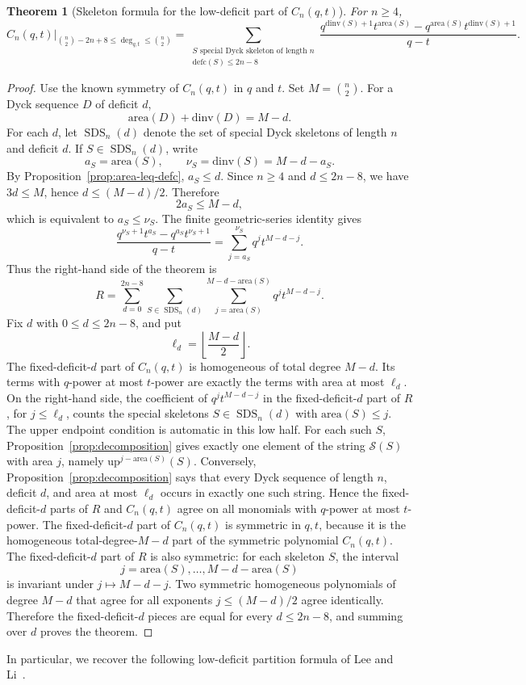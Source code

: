 \documentclass[11pt]{article}
\theoremstyle{plain}
\newtheorem{theorem}{Theorem}[section]
\theoremstyle{definition}
\theoremstyle{remark}
\newcommand{\dinv}{\mathrm{dinv}}
\newcommand{\area}{\mathrm{area}}
\newcommand{\defc}{\mathrm{defc}}
\begin{document}
\begin{theorem}[Skeleton formula for the low-deficit part of \(C_n(q,t)\)]
\label{thm:qt-catalan-skeleton}
For \(n\ge 4\),
\[
  \left.C_n(q,t)\right|_{\binom n2-2n+8\le \deg_{q,t}\le \binom n2}
  =
  \sum_{\substack{S\text{ special Dyck skeleton of length }n\\
                  \defc(S)\le 2n-8}}
  \frac{q^{\dinv(S)+1}t^{\area(S)}
        -q^{\area(S)}t^{\dinv(S)+1}}{q-t}.
\]
\end{theorem}
\begin{proof}
Use the known symmetry of \(C_n(q,t)\) in \(q\) and \(t\).  Set
\(M=\binom n2\).  For a Dyck sequence \(D\) of deficit \(d\),
\[
  \area(D)+\dinv(D)=M-d.
\]
For each \(d\), let \(\operatorname{SDS}_n(d)\) denote the set of special Dyck
skeletons of length \(n\) and deficit \(d\).  If \(S\in\operatorname{SDS}_n(d)\),
write
\[
  a_S=\area(S),
  \qquad
  \nu_S=\dinv(S)=M-d-a_S.
\]
By Proposition~\ref{prop:area-leq-defc}, \(a_S\le d\).  Since \(n\ge4\) and
\(d\le2n-8\), we have \(3d\le M\), hence \(d\le(M-d)/2\).  Therefore
\[
  2a_S\le M-d,
\]
which is equivalent to \(a_S\le\nu_S\).  The finite geometric-series identity gives
\[
  \frac{q^{\nu_S+1}t^{a_S}-q^{a_S}t^{\nu_S+1}}{q-t}
  =
  \sum_{j=a_S}^{\nu_S}q^j t^{M-d-j}.
\]
Thus the right-hand side of the theorem is
\[
  R=
  \sum_{d=0}^{2n-8}
  \sum_{S\in\operatorname{SDS}_n(d)}
  \sum_{j=\area(S)}^{M-d-\area(S)} q^j t^{M-d-j}.
\]
Fix \(d\) with \(0\le d\le 2n-8\), and put
\[
  \ell_d=\left\lfloor\frac{M-d}{2}\right\rfloor .
\]
The fixed-deficit-\(d\) part of \(C_n(q,t)\) is homogeneous of total degree
\(M-d\).  Its terms with \(q\)-power at most \(t\)-power are exactly the
terms with area at most \(\ell_d\).
On the right-hand side, the coefficient of \(q^j t^{M-d-j}\) in the
fixed-deficit-\(d\) part of \(R\), for \(j\le \ell_d\), counts the special
skeletons \(S\in\operatorname{SDS}_n(d)\) with \(\area(S)\le j\).  The upper
endpoint condition is automatic in this low half.  For each such \(S\),
Proposition~\ref{prop:decomposition} gives exactly one element of the string
\(\mathcal S(S)\) with area \(j\), namely
\(\mathrm{up}^{j-\area(S)}(S)\).  Conversely, Proposition~\ref{prop:decomposition}
says that every Dyck sequence of length \(n\), deficit \(d\), and area at most
\(\ell_d\) occurs in exactly one such string.  Hence the fixed-deficit-\(d\)
parts of \(R\) and \(C_n(q,t)\) agree on all monomials with \(q\)-power at most
\(t\)-power.
The fixed-deficit-\(d\) part of \(C_n(q,t)\) is symmetric in \(q,t\), because
it is the homogeneous total-degree-\(M-d\) part of the symmetric polynomial
\(C_n(q,t)\).  The fixed-deficit-\(d\) part of \(R\) is also symmetric: for each
skeleton \(S\), the interval
\[
  j=\area(S),\ldots,M-d-\area(S)
\]
is invariant under \(j\mapsto M-d-j\).  Two symmetric homogeneous polynomials
of degree \(M-d\) that agree for all exponents \(j\le (M-d)/2\) agree
identically.  Therefore the fixed-deficit-\(d\) pieces are equal for every
\(d\le 2n-8\), and summing over \(d\) proves the theorem.
\end{proof}
In particular, we recover the following low-deficit partition formula of Lee and
Li~\cite{LeeLi2011}.
\end{document}
